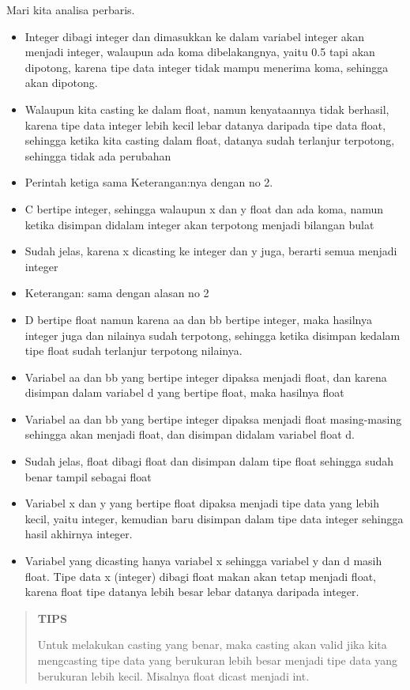 Mari kita analisa perbaris.

\begin{itemize}

\item
Integer dibagi integer dan dimasukkan ke dalam variabel integer akan
menjadi integer, walaupun ada koma dibelakangnya, yaitu 0.5 tapi akan
dipotong, karena tipe data integer tidak mampu menerima koma, sehingga
akan dipotong.
\item
Walaupun kita casting ke dalam float, namun kenyataannya tidak
berhasil, karena tipe data integer lebih kecil lebar datanya daripada
tipe data float, sehingga ketika kita casting dalam float, datanya
sudah terlanjur terpotong, sehingga tidak ada perubahan
\item
Perintah ketiga sama Keterangan:nya dengan no 2.
\item
C bertipe integer, sehingga walaupun x dan y float dan ada koma, namun
ketika disimpan didalam integer akan terpotong menjadi bilangan bulat
\item
Sudah jelas, karena x dicasting ke integer dan y juga, berarti semua
menjadi integer
\item
Keterangan: sama dengan alasan no 2
\item
D bertipe float namun karena aa dan bb bertipe integer, maka hasilnya
integer juga dan nilainya sudah terpotong, sehingga ketika disimpan
kedalam tipe float sudah terlanjur terpotong nilainya.
\item
Variabel aa dan bb yang bertipe integer dipaksa menjadi float, dan
karena disimpan dalam variabel d yang bertipe float, maka hasilnya
float
\item
Variabel aa dan bb yang bertipe integer dipaksa menjadi float
masing-masing sehingga akan menjadi float, dan disimpan didalam
variabel float d.
\item
Sudah jelas, float dibagi float dan disimpan dalam tipe float sehingga
sudah benar tampil sebagai float
\item
Variabel x dan y yang bertipe float dipaksa menjadi tipe data yang
lebih kecil, yaitu integer, kemudian baru disimpan dalam tipe data
integer sehingga hasil akhirnya integer.
\item
Variabel yang dicasting hanya variabel x sehingga variabel y dan d
masih float. Tipe data x (integer) dibagi float makan akan tetap
menjadi float, karena float tipe datanya lebih besar lebar datanya
daripada integer.
\end{itemize}

\begin{quotation}

{\LARGE {}} \textbf{TIPS}

Untuk melakukan casting yang benar, maka casting akan valid jika kita mengcasting tipe data yang berukuran lebih besar menjadi tipe data yang berukuran lebih kecil. Misalnya float dicast menjadi int.
\end{quotation}


